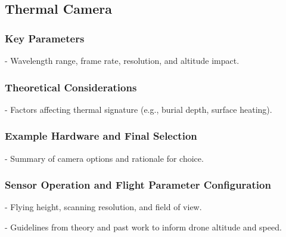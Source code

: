 \subsection{Thermal Camera}

\subsubsection{Key Parameters}
- Wavelength range, frame rate, resolution, and altitude impact.

\subsubsection{Theoretical Considerations}
- Factors affecting thermal signature (e.g., burial depth, surface heating).

\subsubsection{Example Hardware and Final Selection}
- Summary of camera options and rationale for choice.

\subsubsection{Sensor Operation and Flight Parameter Configuration}
- Flying height, scanning resolution, and field of view.

- Guidelines from theory and past work to inform drone altitude and speed.